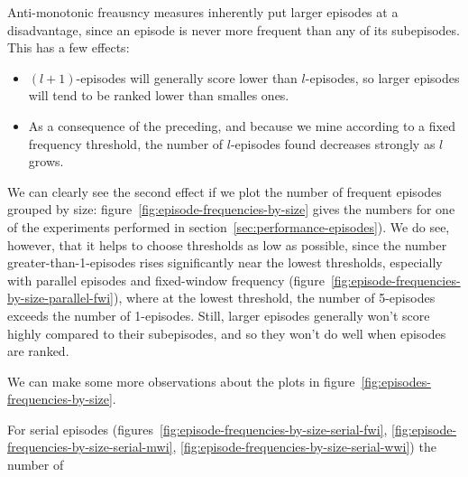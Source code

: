 Anti-monotonic freausncy measures inherently put larger episodes at a disadvantage, since an episode is never more frequent than any of its subepisodes. This has a few effects:
\begin{itemize}
\item $ (l + 1) $-episodes will generally score lower than $ l $-episodes, so larger episodes will tend to be ranked lower than smalles ones.
\item As a consequence of the preceding, and because we mine according to a fixed frequency threshold, the number of $ l $-episodes found decreases strongly as $ l $ grows.
\end{itemize}
We can clearly see the second effect if we plot the number of frequent episodes grouped by size: figure~\ref{fig:episode-frequencies-by-size} gives the numbers for one of the experiments performed in section~\ref{sec:performance-episodes}). We do see, however, that it helps to choose thresholds as low as possible, since the number greater-than-1-episodes rises significantly near the lowest thresholds, especially with parallel episodes and fixed-window frequency (figure~\ref{fig:episode-frequencies-by-size-parallel-fwi}), where at the lowest threshold, the number of 5-episodes exceeds the number of 1-episodes. Still, larger episodes generally won't score highly compared to their subepisodes, and so they won't do well when episodes are ranked.

We can make some more observations about the plots in figure~\ref{fig:episodes-frequencies-by-size}. %

For serial episodes (figures~\ref{fig:episode-frequencies-by-size-serial-fwi}, \ref{fig:episode-frequencies-by-size-serial-mwi}, \ref{fig:episode-frequencies-by-size-serial-wwi}) the number of %

